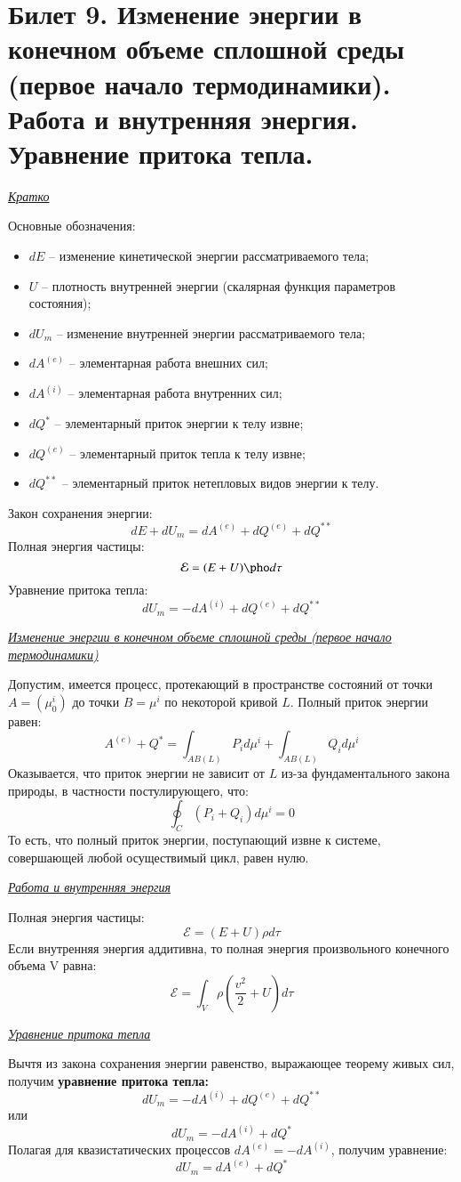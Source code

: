 \newpage
\section{Билет 9. Изменение энергии в конечном объеме сплошной среды (первое начало термодинамики). Работа и внутренняя энергия. Уравнение притока тепла.}
\begin{center}
	\textit{\underline{Кратко}}
\end{center}
Основные обозначения:
\begin{itemize}
    \item $dE$ -- изменение кинетической энергии рассматриваемого тела;
    \item $U$ -- плотность внутренней энергии (скалярная функция параметров состояния);
    \item $dU_m$ -- изменение внутренней энергии рассматриваемого тела;
    \item $dA^{(e)}$ -- элементарная работа внешних сил;
    \item $dA^{(i)}$ -- элементарная работа внутренних сил;
    \item $dQ^{*}$ -- элементарный приток энергии к телу извне;
    \item $dQ^{(e)}$ -- элементарный приток тепла к телу извне;
    \item $dQ^{**}$ -- элементарный приток нетепловых видов энергии к телу.
\end{itemize}
Закон сохранения энергии:
$$
dE + dU_m = dA^{(e)} + dQ^{(e)} + dQ^{**}
$$
Полная энергия частицы:
$$
\mathcal{E} = (E + U)\pho d\tau
$$
Уравнение притока тепла:
$$
dU_m = -dA^{(i)} + dQ^{(e)} + dQ^{**}
$$

\begin{center}
	\textit{\underline{Изменение энергии в конечном объеме сплошной среды (первое начало термодинамики)}}
\end{center}
Допустим, имеется процесс, протекающий в пространстве состояний от точки $A = (\mu^i_0)$ до точки $B = \mu^i$ по некоторой кривой $L$. Полный приток энергии равен:
$$
A^{(e)} + Q^{*} = \int_{AB(L)}P_id\mu^i + \int_{AB(L)}Q_id\mu^i
$$
Оказывается, что приток энергии не зависит от $L$ из-за фундаментального закона природы, в частности постулирующего, что:
$$
\oint_{C}(P_i + Q_i)d\mu^i = 0
$$
То есть, что полный приток энергии, поступающий извне к системе, совершающей любой осуществимый цикл, равен нулю.
\begin{center}
	\textit{\underline{Работа и внутренняя энергия}}
\end{center}
Полная энергия частицы:
$$
\mathcal{E} = (E + U)\rho d\tau
$$
Если внутренняя энергия аддитивна, то полная энергия произвольного конечного объема V равна:
$$
\mathcal{E} = \int_{V}\rho(\frac{v^2}{2} + U)d\tau
$$
\begin{center}
	\textit{\underline{Уравнение притока тепла}}
\end{center}
Вычтя из закона сохранения энергии равенство, выражающее теорему живых сил, получим \textbf{уравнение притока тепла:}
$$
dU_m = -dA^{(i)} + dQ^{(e)} + dQ^{**}
$$
или
$$
dU_m = -dA^{(i)} + dQ^{*}
$$
Полагая для квазистатических процессов $dA^{(e)} = -dA^{(i)}$, получим уравнение:
$$
dU_m = dA^{(e)} + dQ^{*}
$$
